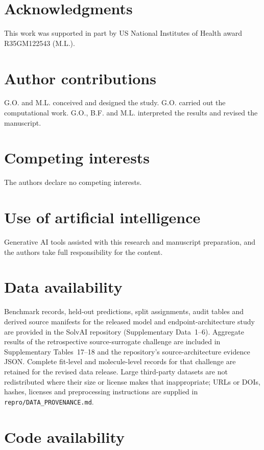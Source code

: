 \documentclass[12pt]{article}
\begin{document}
\section*{Acknowledgments}

This work was supported in part by US National Institutes of Health award
R35GM122543 (M.L.).

\section*{Author contributions}

G.O. and M.L. conceived and designed the study. G.O. carried out the
computational work. G.O., B.F. and M.L. interpreted the results and revised
the manuscript.

\section*{Competing interests}

The authors declare no competing interests.

\section*{Use of artificial intelligence}

Generative AI tools assisted with this research and manuscript preparation, and the authors take full responsibility for the content.

\section*{Data availability}

Benchmark records, held-out predictions, split assignments, audit tables and
derived source manifests for the released model and endpoint-architecture study
are provided in the SolvAI repository (Supplementary Data~1--6). Aggregate
results of the retrospective source-surrogate challenge are included in
Supplementary Tables~17--18 and the repository's source-architecture
evidence JSON. Complete
fit-level and molecule-level records for that challenge are retained for the
revised data release. Large third-party datasets are not redistributed where
their size or license makes that inappropriate; URLs or DOIs, hashes, licenses
and preprocessing instructions are supplied in \texttt{repro/DATA\_PROVENANCE.md}.

\section*{Code availability}
\end{document}
